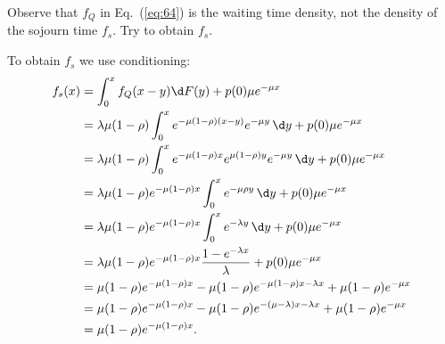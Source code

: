 \begin{exercise}
  Observe that $f_Q$ in Eq.~(\ref{eq:64}) is the waiting time density, not the
  density of the sojourn time $f_s$. Try to obtain $f_s$.
  \begin{solution}
    To obtain $f_s$ we use conditioning:
\begin{align*}
f_s(x)
&= \int_0^x f_Q(x-y) \d F(y) + p(0) \mu e^{-\mu x} \\
&= \lambda \mu (1-\rho) \int_0^x  e^{- \mu(1-\rho)(x-y)} e^{-\mu y} \,\d y + p(0) \mu e^{-\mu x} \\
&= \lambda \mu (1-\rho) \int_0^x  e^{- \mu(1-\rho)x} e^{\mu(1-\rho)y} e^{-\mu y} \,\d y + p(0) \mu e^{-\mu x} \\
&= \lambda \mu (1-\rho) e^{- \mu(1-\rho)x} \int_0^x  e^{- \mu \rho y} \, \d y + p(0) \mu e^{-\mu x} \\
&= \lambda \mu (1-\rho) e^{- \mu(1-\rho)x} \int_0^x  e^{- \lambda y} \,\d y + p(0) \mu e^{-\mu x} \\
&= \lambda \mu (1-\rho) e^{- \mu(1-\rho)x} \frac{1 - e^{- \lambda x}}{\lambda} + p(0) \mu e^{-\mu x} \\
&= \mu (1-\rho) e^{- \mu(1-\rho)x} - \mu (1-\rho) e^{- \mu(1-\rho)x - \lambda x} + \mu (1-\rho) e^{-\mu x} \\
&= \mu (1-\rho) e^{- \mu(1-\rho)x} - \mu (1-\rho) e^{- (\mu - \lambda) x - \lambda x} + \mu (1-\rho) e^{-\mu x} \\
&= \mu (1-\rho) e^{- \mu(1-\rho)x}.
\end{align*}
  \end{solution}
\end{exercise}
